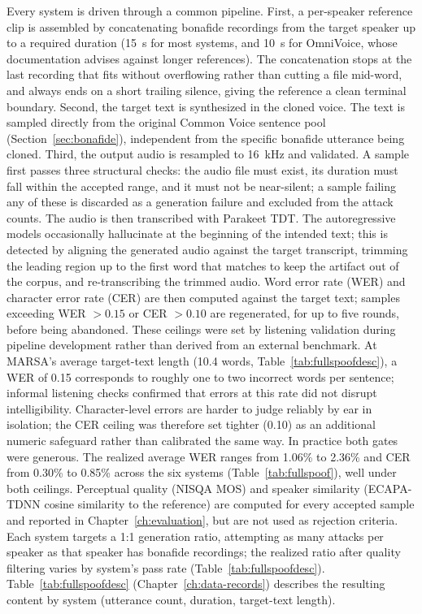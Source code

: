 \documentclass[11pt]{report}
\begin{document}
Every system is driven through a common pipeline. First, a per-speaker
reference clip is assembled by concatenating bonafide recordings from
the target speaker up to a required duration (\SI{15}{\second} for most
systems, and \SI{10}{\second} for OmniVoice, whose documentation advises
against longer references). The concatenation stops at the last
recording that fits without overflowing rather than cutting a file
mid-word, and always ends on a short trailing silence, giving the
reference a clean terminal boundary. Second, the target text is
synthesized in the cloned voice. The text is sampled directly from the
original Common Voice sentence pool (Section~\ref{sec:bonafide}),
independent from the specific bonafide utterance being cloned. Third,
the output audio is resampled to \SI{16}{\kilo\hertz} and validated. A
sample first passes three structural checks: the audio file must exist,
its duration must fall within the accepted range, and it must not be
near-silent; a sample failing any of these is discarded as a
generation failure and excluded from the attack counts. The audio is then transcribed with
Parakeet TDT. The autoregressive models occasionally hallucinate at the
beginning of the intended text; this is detected by aligning the
generated audio against the target transcript, trimming the leading
region up to the first word that matches to keep the artifact out of
the corpus, and re-transcribing the trimmed audio. Word error rate
(WER) and character error rate (CER) are then computed against the
target text; samples exceeding WER $>0.15$ or CER $>0.10$ are
regenerated, for up to five rounds, before being abandoned. These
ceilings were set by listening validation during pipeline development
rather than derived from an external benchmark. At MARSA's average
target-text length (10.4 words, Table~\ref{tab:fullspoofdesc}), a WER
of 0.15 corresponds to roughly one to two incorrect words per sentence;
informal listening checks confirmed that errors at this rate did not
disrupt intelligibility. Character-level errors are harder to judge
reliably by ear in isolation; the CER ceiling was therefore set tighter (0.10)
as an additional numeric safeguard rather than calibrated the same way.
In practice both gates were generous. The realized average WER ranges
from 1.06\% to 2.36\% and CER from 0.30\% to 0.85\% across the six
systems (Table~\ref{tab:fullspoof}), well under both ceilings.
Perceptual quality (NISQA MOS) and speaker similarity (ECAPA-TDNN
cosine similarity to the reference) are computed for every accepted
sample and reported in Chapter~\ref{ch:evaluation}, but are not used as
rejection criteria. Each system targets a 1:1 generation ratio, attempting as many attacks
per speaker as that speaker has bonafide recordings; the realized ratio
after quality filtering varies by system's pass rate
(Table~\ref{tab:fullspoofdesc}).
Table~\ref{tab:fullspoofdesc} (Chapter~\ref{ch:data-records}) describes
the resulting content by system (utterance count, duration, target-text
length).
\end{document}
